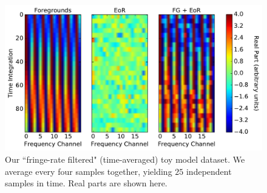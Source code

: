 \documentclass[preprint2,numberedappendix,tighten]{aastex6}  %
\newcommand{\acl}[1]{{\color{red} \textbf{[ACL:  #1]}}}
\begin{document}

\begin{figure}
	\centering
	\includegraphics[width=\columnwidth]{plots/toy_sigloss5.pdf}
	\caption{Our ``fringe-rate filtered" (time-averaged) toy model dataset. We average every four samples together, 
yielding $25$ independent samples in time. Real parts are shown here.}
	\label{fig:toy_sigloss5}
\end{figure}

\end{document}
